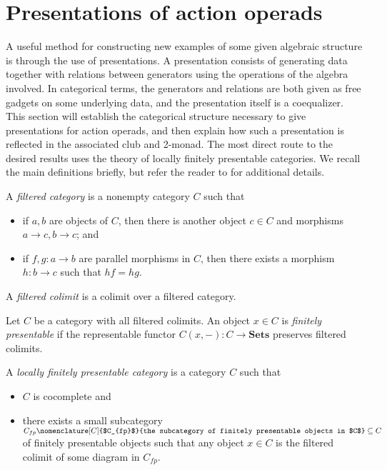 \documentclass{amsbook} %
\newcommand{\mb}{\mathbf}
\numberwithin{section}{chapter}
\begin{document}
\section{Presentations of action operads}\label{sec:presofacops}
A useful method for constructing new examples of some given algebraic structure is through the use of presentations. A presentation consists of generating data together with relations between generators using the operations of the algebra involved.  In categorical terms, the generators and relations are both given as free gadgets on some underlying data, and the presentation itself is a coequalizer. This section will establish the categorical structure necessary to give presentations for action operads, and then explain how such a presentation is reflected in the associated club and 2-monad. The most direct route to the desired results uses the theory of locally finitely presentable categories. We recall the main definitions briefly, but refer the reader to \cite{ar} for additional details.

\begin{Defi}\label{def:filtered}
  A \textit{filtered category} is a nonempty category $C$ such that
    \begin{itemize}
      \item if $a,b$ are objects of $C$, then there is another object $c \in C$ and morphisms $a \rightarrow c, b \rightarrow c$; and
      \item if $f,g \colon a \rightarrow b$ are parallel morphisms in $C$, then there exists a morphism $h \colon b \rightarrow c$ such that $hf = hg$.
    \end{itemize}
\end{Defi}

\begin{Defi}
  A \emph{filtered colimit} is a colimit over a filtered category.
\end{Defi}

\begin{Defi}
  Let $C$ be a category with all filtered colimits.  An object $x \in C$ is \textit{finitely presentable} if the representable functor $C(x, -) \colon C \rightarrow \mb{Sets}$ preserves filtered colimits.
\end{Defi}

\begin{Defi}
  A \textit{locally finitely presentable category} is a category $C$ such that
  \begin{itemize}
    \item $C$ is cocomplete and
    \item there exists a small subcategory $C_{fp}\nomenclature[C]{$C_{fp}$}{the subcategory of finitely presentable objects in $C$} \subseteq C$ of finitely presentable objects such that any object $x \in C$ is the filtered colimit of some diagram in $C_{fp}$.
  \end{itemize}
\end{Defi}
\end{document}
